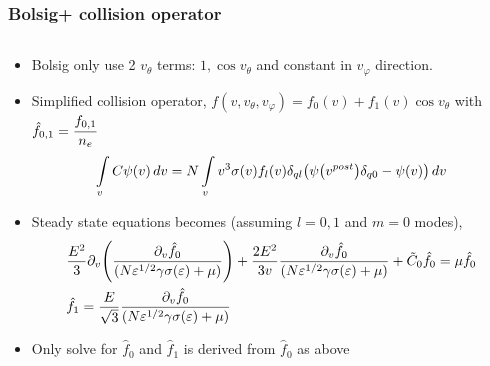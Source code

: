 \documentclass[mathserif, aspectratio=169]{beamer}
\newcommand{\vect}[1]{\boldsymbol{#1}}
\newcommand{\of}[1]{\mleft( #1 \mright)}
\newcommand{\myint}{\int\limits}
\newcommand{\diff}[1]{\, d#1}
\newcommand{\vtheta}{{v_{\theta}}}
\newcommand{\vphi}{v_{\varphi}}
\begin{document}
\begin{frame}
	\frametitle{Bolsig+ collision operator}
	\begin{columns}
		\begin{column}{\textwidth}
			\begin{itemize}
				\item Bolsig only use 2 $\vtheta$ terms: $1, \cos\vtheta$ and constant in $\vphi$ direction. 
				\item Simplified collision operator, $f(v,\vtheta,\vphi) = f_0(v) + f_1(v) \cos\vtheta$ with $\hat{f}_{0,1} = \cfrac{f_{0,1}}{n_e}$
				\begin{align}
					\myint_{v} C \psi\of{v} \diff{v}  = N \myint_{v} v^3 \sigma\of{v} f_l\of{v} \delta_{ql} \of{\psi\of{v^{post}}\delta_{q0} - \psi\of{v}} \diff{v}  
				\end{align}
				\item Steady state equations becomes (assuming $l=0,1$ and $m=0$ modes), 
				\begin{align}
					&\frac{E^2}{3} \partial_{v} \of{\frac{\partial_v \hat f_0}{(N \varepsilon^{1/2}\gamma \sigma\of{\varepsilon} + \mu)}} + \frac{2E^2}{3v} \frac{\partial_v \hat{f_0}}{(N \varepsilon^{1/2}\gamma \sigma\of{\varepsilon} + \mu)} + \tilde C_0 \hat{f_0} = \mu \hat{f_0} \\
					&\hat{f_1} = \frac{E}{\sqrt{3}} \frac{\partial_{v}\hat{f_0}}{(N \varepsilon^{1/2}\gamma \sigma\of{\varepsilon} + \mu)}
				\end{align}
				\item Only solve for $\hat{f}_0$ and $\hat{f}_1$ is derived from $\hat{f}_0$ as above
			\end{itemize}
		\end{column}
			
	\end{columns}
\end{frame}
\end{document}
